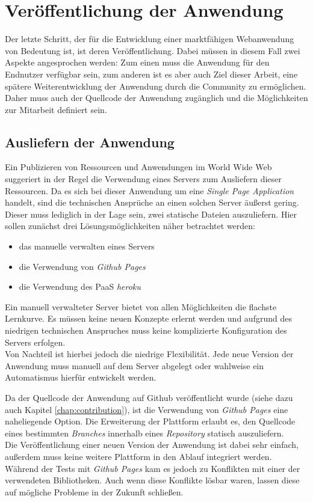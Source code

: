 \chapter{Veröffentlichung der Anwendung}
\thispagestyle{fancy}

Der letzte Schritt, der für die Entwicklung einer marktfähigen Webanwendung von Bedeutung ist, ist deren Veröffentlichung. Dabei müssen in diesem Fall zwei Aspekte angesprochen werden: Zum einen muss die Anwendung für den Endnutzer verfügbar sein, zum anderen ist es aber auch Ziel dieser Arbeit, eine spätere Weiterentwicklung der Anwendung durch die Community zu ermöglichen. Daher muss auch der Quellcode der Anwendung zugänglich und die Möglichkeiten zur Mitarbeit definiert sein.

\section{Ausliefern der Anwendung}
\label{chap:hosting}
Ein Publizieren von Ressourcen und Anwendungen im World Wide Web suggeriert in der Regel die Verwendung eines Servers zum Ausliefern dieser Ressourcen. Da es sich bei dieser Anwendung um eine \textit{Single Page Application} handelt, sind die technischen Ansprüche an einen solchen Server äußerst gering. Dieser muss lediglich in der Lage sein, zwei statische Dateien auszuliefern.
Hier sollen zunächst drei Lösungsmöglichkeiten näher betrachtet werden:

\begin{itemize}
  \item das manuelle verwalten eines Servers
  \item die Verwendung von \textit{Github Pages}
  \item die Verwendung des PaaS \textit{heroku}
\end{itemize}

Ein manuell verwalteter Server bietet von allen Möglichkeiten die flachste Lernkurve. Es müssen keine neuen Konzepte erlernt werden und aufgrund des niedrigen technischen Anspruches muss keine komplizierte Konfiguration des Servers erfolgen.\\
Von Nachteil ist hierbei jedoch die niedrige Flexibilität. Jede neue Version der Anwendung muss manuell auf dem Server abgelegt oder wahlweise ein Automatismus hierfür entwickelt werden.

Da der Quellcode der Anwendung auf Github veröffentlicht wurde (siehe dazu auch Kapitel \ref{chap:contribution}), ist die Verwendung von \textit{Github Pages} eine naheliegende Option. Die Erweiterung der Plattform erlaubt es, den Quellcode eines bestimmten \textit{Branches} innerhalb eines \textit{Repository} statisch auszuliefern.\\
Die Veröffentlichung einer neuen Version der Anwendung ist dabei sehr einfach, außerdem muss keine weitere Plattform in den Ablauf integriert werden. Während der Tests mit \textit{Github Pages} kam es jedoch zu Konflikten mit einer der verwendeten Bibliotheken. Auch wenn diese Konflikte lösbar waren, lassen diese auf mögliche Probleme in der Zukunft schließen.

